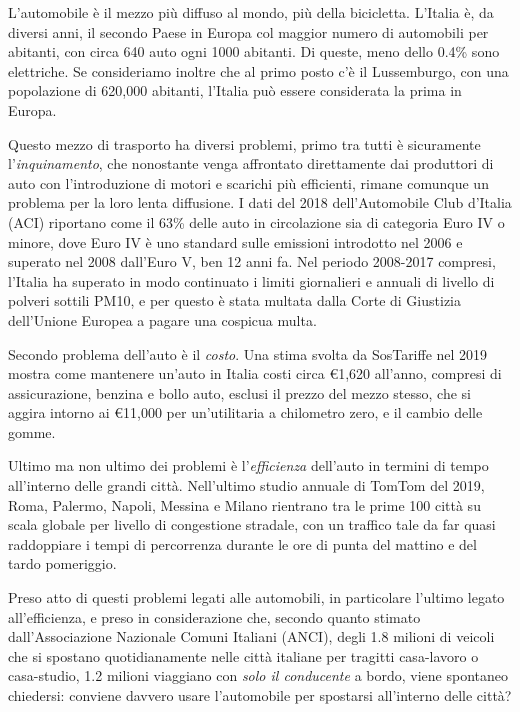 L'automobile è il mezzo più diffuso al mondo, più della bicicletta. L'Italia è, da diversi anni, il secondo Paese in Europa col maggior numero di automobili per abitanti, con circa 640 auto ogni 1000 abitanti. Di queste, meno dello 0.4\% sono elettriche. Se consideriamo inoltre che al primo posto c'è il Lussemburgo, con una popolazione di 620,000 abitanti, l'Italia può essere considerata la prima in Europa.

Questo mezzo di trasporto ha diversi problemi, primo tra tutti è sicuramente l'\emph{inquinamento}, che nonostante venga affrontato direttamente dai produttori di auto con l'introduzione di motori e scarichi più efficienti, rimane comunque un problema per la loro lenta diffusione. I dati del 2018 dell'Automobile Club d'Italia (ACI) riportano come il 63\% delle auto in circolazione sia di categoria Euro IV o minore, dove Euro IV è uno standard sulle emissioni introdotto nel 2006 e superato nel 2008 dall'Euro V, ben 12 anni fa. Nel periodo 2008-2017 compresi, l'Italia ha superato in modo continuato i limiti giornalieri e annuali di livello di polveri sottili PM10, e per questo è stata multata dalla Corte di Giustizia dell'Unione Europea a pagare una cospicua multa.

Secondo problema dell'auto è il \emph{costo}. Una stima svolta da SosTariffe nel 2019 mostra come mantenere un'auto in Italia costi circa €1,620 all'anno, compresi di assicurazione, benzina e bollo auto, esclusi il prezzo del mezzo stesso, che si aggira intorno ai €11,000 per un'utilitaria a chilometro zero, e il cambio delle gomme.

Ultimo ma non ultimo dei problemi è l'\emph{efficienza} dell'auto in termini di tempo all'interno delle grandi città. Nell'ultimo studio annuale di TomTom del 2019\cite{tomtomindexmilan}, Roma, Palermo, Napoli, Messina e Milano rientrano tra le prime 100 città su scala globale per livello di congestione stradale, con un traffico tale da far quasi raddoppiare i tempi di percorrenza durante le ore di punta del mattino e del tardo pomeriggio.

Preso atto di questi problemi legati alle automobili, in particolare l'ultimo legato all'efficienza, e preso in considerazione che, secondo quanto stimato dall'Associazione Nazionale Comuni Italiani (ANCI), degli 1.8 milioni di veicoli che si spostano quotidianamente nelle città italiane per tragitti casa-lavoro o casa-studio, 1.2 milioni viaggiano con \emph{solo il conducente} a bordo, viene spontaneo chiedersi: conviene davvero usare l'automobile per spostarsi all'interno delle città?
